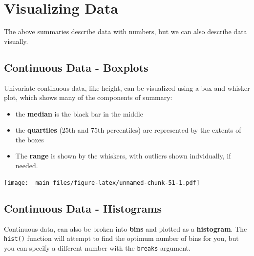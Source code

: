 \documentclass[
]{book}
\newenvironment{Shaded}{\begin{snugshade}}{\end{snugshade}}
\newcommand{\AttributeTok}[1]{\textcolor[rgb]{0.13,0.29,0.53}{#1}}
\newcommand{\FunctionTok}[1]{\textcolor[rgb]{0.13,0.29,0.53}{\textbf{#1}}}
\newcommand{\NormalTok}[1]{#1}
\newcommand{\SpecialCharTok}[1]{\textcolor[rgb]{0.81,0.36,0.00}{\textbf{#1}}}
\newcommand{\StringTok}[1]{\textcolor[rgb]{0.31,0.60,0.02}{#1}}
\providecommand{\tightlist}{%
  \setlength{\itemsep}{0pt}\setlength{\parskip}{0pt}}
\begin{document}
\hypertarget{visualizing-data-1}{%
\section{Visualizing Data}\label{visualizing-data-1}}

The above summaries describe data with numbers, but we can also describe data visually.

\hypertarget{continuous-data---boxplots}{%
\subsection{Continuous Data - Boxplots}\label{continuous-data---boxplots}}

Univariate continuous data, like height, can be visualized using a box and whisker plot, which shows many of the components of summary:

\begin{itemize}
\tightlist
\item
  the \textbf{median} is the black bar in the middle
\item
  the \textbf{quartiles} (25th and 75th percentiles) are represented by the extents of the boxes
\item
  The \textbf{range} is shown by the whiskers, with outliers shown indvidually, if needed.
\end{itemize}

\begin{Shaded}
\end{Shaded}

\texttt{[image: \_main\_files/figure-latex/unnamed-chunk-51-1.pdf]}

\hypertarget{continuous-data---histograms}{%
\subsection{Continuous Data - Histograms}\label{continuous-data---histograms}}

Continuous data, can also be broken into \textbf{bins} and plotted as a \textbf{histogram}. The \texttt{hist()} function will attempt to find the optimum number of bins for you, but you can specify a different number with the \texttt{breaks} argument.

\begin{Shaded}
\end{Shaded}
\end{document}

